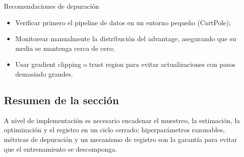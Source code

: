 \begin{importantbox}{Recomendaciones de depuración}
\begin{itemize}
    \item Verificar primero el pipeline de datos en un entorno pequeño (CartPole);
    \item Monitorear manualmente la distribución del advantage, asegurando que su media se mantenga cerca de cero;
    \item Usar gradient clipping o trust region para evitar actualizaciones con pasos demasiado grandes.
\end{itemize}
\end{importantbox}

\subsection{Resumen de la sección}
A nivel de implementación es necesario encadenar el muestreo, la estimación, la optimización y el registro en un ciclo cerrado; hiperparámetros razonables, métricas de depuración y un mecanismo de registro son la garantía para evitar que el entrenamiento se descomponga.

